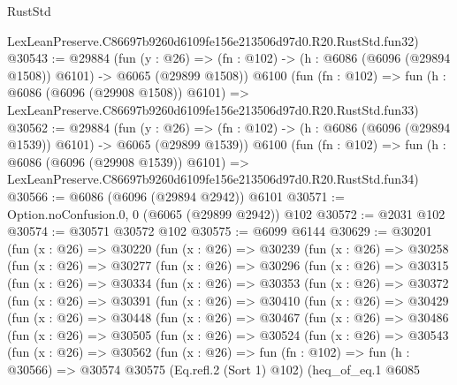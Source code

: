 \begin{lexlean}{RustStd}
\begin{coremodule}
    LexLeanPreserve.C86697b9260d6109fe156e213506d97d0.R20.RustStd.fun32)
@30543 := @29884
    (fun (y : @26) =>
    (fn : @102) -> (h : @6086 (@6096 (@29894 @1508)) @6101) -> @6065 (@29899 @1508))
    @6100
    (fun (fn : @102) =>
    fun (h : @6086 (@6096 (@29908 @1508)) @6101) =>
    LexLeanPreserve.C86697b9260d6109fe156e213506d97d0.R20.RustStd.fun33)
@30562 := @29884
    (fun (y : @26) =>
    (fn : @102) -> (h : @6086 (@6096 (@29894 @1539)) @6101) -> @6065 (@29899 @1539))
    @6100
    (fun (fn : @102) =>
    fun (h : @6086 (@6096 (@29908 @1539)) @6101) =>
    LexLeanPreserve.C86697b9260d6109fe156e213506d97d0.R20.RustStd.fun34)
@30566 := @6086 (@6096 (@29894 @2942)) @6101
@30571 := Option.noConfusion.{0, 0} (@6065 (@29899 @2942)) @102
@30572 := @2031 @102
@30574 := @30571 @30572 @102
@30575 := @6099 @6144
@30629 := @30201
    (fun (x : @26) =>
    @30220
      (fun (x : @26) =>
      @30239
        (fun (x : @26) =>
        @30258
          (fun (x : @26) =>
          @30277
            (fun (x : @26) =>
            @30296
              (fun (x : @26) =>
              @30315
                (fun (x : @26) =>
                @30334
                  (fun (x : @26) =>
                  @30353
                    (fun (x : @26) =>
                    @30372
                      (fun (x : @26) =>
                      @30391
                        (fun (x : @26) =>
                        @30410
                          (fun (x : @26) =>
                          @30429
                            (fun (x : @26) =>
                            @30448
                              (fun (x : @26) =>
                              @30467
                                (fun (x : @26) =>
                                @30486
                                  (fun (x : @26) =>
                                  @30505
                                    (fun (x : @26) =>
                                    @30524
                                      (fun (x : @26) =>
                                      @30543
                                        (fun (x : @26) =>
                                        @30562
                                          (fun (x : @26) =>
                                          fun (fn : @102) =>
                                          fun (h : @30566) =>
                                          @30574
                                            @30575
                                            (Eq.refl.{2} (Sort 1) @102)
                                            (heq_of_eq.{1}
                                              @6085

\end{coremodule}
\end{lexlean}
